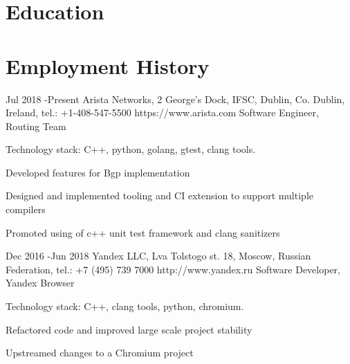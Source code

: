 \documentclass[9pt]{article} %
\begin{document}
\section{Education}



\section{Employment History}

\job
{Jul 2018 -}{Present}
{Arista Networks, 2 George's Dock, IFSC, Dublin, Co. Dublin, Ireland, tel.: +1-408-547-5500}
{https://www.arista.com}
{Software Engineer, Routing Team}
{
Technology stack: C++, python, golang, gtest, clang tools.
\begin{itemize-noindent}
\setlength\itemsep{0em}
\item{Developed features for Bgp implementation}
\item{Designed and implemented tooling and CI extension to support multiple compilers}
\item{Promoted using of c++ unit test framework and clang sanitizers}
\end{itemize-noindent}
}


\job
{Dec 2016 -}{Jun 2018}
{Yandex LLC, Lva Tolstogo st. 18, Moscow, Russian Federation, tel.: +7 (495) 739 7000}
{http://www.yandex.ru}
{Software Developer, Yandex Browser}
{
Technology stack: C++, clang tools, python, chromium.
\begin{itemize-noindent}
\setlength\itemsep{0em}
\item{Refactored code and improved large scale project stability}
\item{Upstreamed changes to a Chromium project}
\end{itemize-noindent}
}
\end{document}
